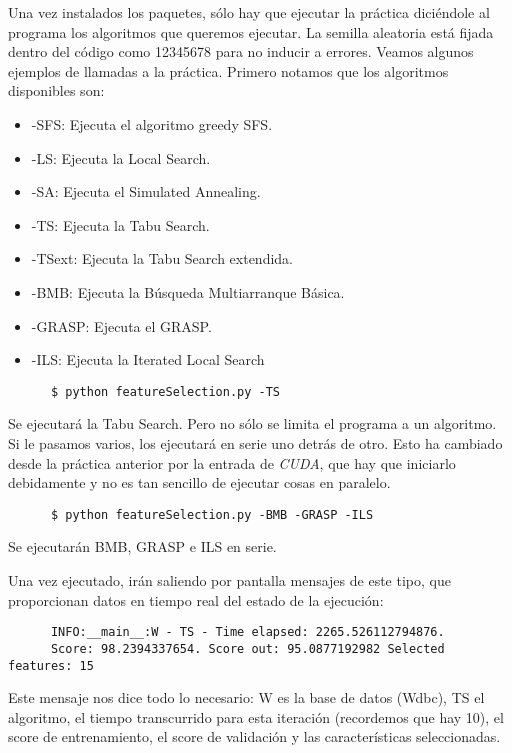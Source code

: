 \documentclass[a4paper, 11pt]{article}
\begin{document}
    Una vez instalados los paquetes, sólo hay que ejecutar la práctica diciéndole al programa los algoritmos que queremos ejecutar. La semilla aleatoria está fijada dentro del código como 12345678 para no inducir a errores. Veamos algunos ejemplos de llamadas a la práctica. Primero notamos que los algoritmos disponibles son:

    \begin{itemize}
      \item -SFS: Ejecuta el algoritmo greedy SFS.
      \item -LS: Ejecuta la Local Search.
      \item -SA: Ejecuta el Simulated Annealing.
      \item -TS: Ejecuta la Tabu Search.
      \item -TSext: Ejecuta la Tabu Search extendida.
      \item -BMB: Ejecuta la Búsqueda Multiarranque Básica.
      \item -GRASP: Ejecuta el GRASP.
      \item -ILS: Ejecuta la Iterated Local Search
    \end{itemize}

    \begin{verbatim}
      $ python featureSelection.py -TS
    \end{verbatim}
    Se ejecutará la Tabu Search. Pero no sólo se limita el programa a un algoritmo. Si le pasamos varios, los ejecutará en serie uno detrás de otro. Esto ha cambiado desde la práctica anterior por la entrada de \emph{CUDA}, que hay que iniciarlo debidamente y no es tan sencillo de ejecutar cosas en paralelo.

    \begin{verbatim}
      $ python featureSelection.py -BMB -GRASP -ILS
    \end{verbatim}
    Se ejecutarán BMB, GRASP e ILS en serie.

    Una vez ejecutado, irán saliendo por pantalla mensajes de este tipo, que proporcionan datos en tiempo real del estado de la ejecución:

    \begin{verbatim}
      INFO:__main__:W - TS - Time elapsed: 2265.526112794876.
      Score: 98.2394337654. Score out: 95.0877192982 Selected features: 15
    \end{verbatim}

    Este mensaje nos dice todo lo necesario: W es la base de datos (Wdbc), TS el algoritmo, el tiempo transcurrido para esta iteración (recordemos que hay 10), el score de entrenamiento, el score de validación y las características seleccionadas.
\end{document}
